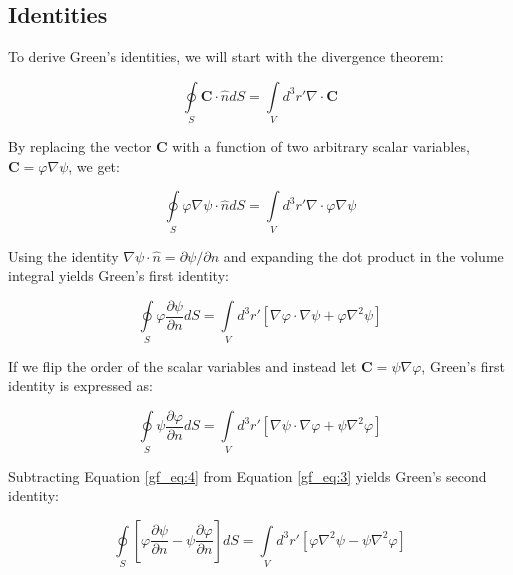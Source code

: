 \subsection{Identities}
To derive Green’s identities, we will start with the divergence theorem:

\begin{equation}
\oint\limits_{S} \mathbf{C} \cdot \hat{n} dS = \int\limits_{V}d^3r'\nabla \cdot \mathbf{C}
\label{gf_eq:1}
\end{equation}
\renewcommand{\baselinestretch}{2} \small\normalsize

By replacing the vector $\mathbf{C}$ with a function of two arbitrary scalar variables, $\mathbf{C}=\varphi\nabla\psi$, we get:

\begin{equation}
\oint\limits_{S} \varphi\nabla\psi \cdot \hat{n} dS = \int\limits_{V}d^3r'\nabla \cdot \varphi\nabla\psi
\label{gf_eq:2}
\end{equation}
\renewcommand{\baselinestretch}{2} \small\normalsize

Using the identity $\nabla\psi\cdot \hat{n} = \partial \psi/\partial n$ and expanding the dot product in the volume integral yields Green's first identity:

\begin{equation}
\boxed{\oint\limits_{S} \varphi\frac{\partial \psi}{\partial n} dS = \int\limits_{V}d^3r' \left[ \nabla\varphi \cdot \nabla\psi +\varphi \nabla^2 \psi\right]}
\label{gf_eq:3}
\end{equation}
\renewcommand{\baselinestretch}{2} \small\normalsize

If we flip the order of the scalar variables and instead let $\mathbf{C}=\psi\nabla\varphi$, Green's first identity is expressed as:

\begin{equation}
\oint\limits_{S} \psi\frac{\partial \varphi}{\partial n} dS = \int\limits_{V}d^3r' \left[ \nabla\psi \cdot \nabla\varphi +\psi \nabla^2 \varphi\right]
\label{gf_eq:4}
\end{equation}
\renewcommand{\baselinestretch}{2} \small\normalsize

\noindent Subtracting Equation \ref{gf_eq:4} from Equation \ref{gf_eq:3} yields Green's second identity:

\begin{equation}
\boxed{\oint\limits_{S} \left[ \varphi\frac{\partial \psi}{\partial n} - \psi\frac{\partial \varphi}{\partial n} \right]dS = \int\limits_{V}d^3r' \left[ \varphi\nabla^2\psi- \psi \nabla^2 \varphi\right]}
\label{gf_eq:5}
\end{equation}


